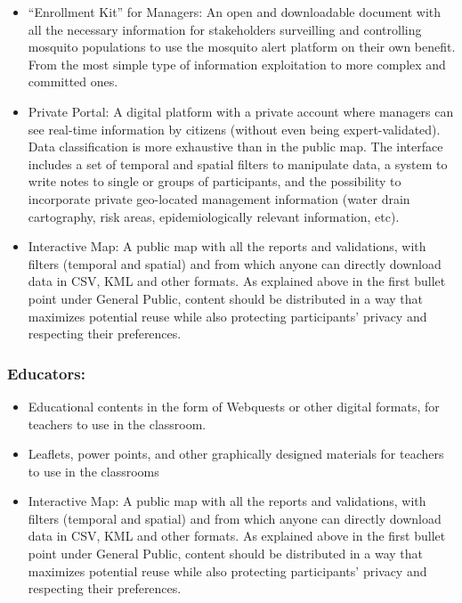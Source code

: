 \documentclass[]{article}
\providecommand{\tightlist}{%
  \setlength{\itemsep}{0pt}\setlength{\parskip}{0pt}}
\begin{document}
\begin{itemize}
\tightlist
\item
  ``Enrollment Kit'' for Managers: An open and downloadable document with all the necessary information for stakeholders surveilling and controlling mosquito populations to use the mosquito alert platform on their own benefit. From the most simple type of information exploitation to more complex and committed ones.
\item
  Private Portal: A digital platform with a private account where managers can see real-time information by citizens (without even being expert-validated). Data classification is more exhaustive than in the public map. The interface includes a set of temporal and spatial filters to manipulate data, a system to write notes to single or groups of participants, and the possibility to incorporate private geo-located management information (water drain cartography, risk areas, epidemiologically relevant information, etc).
\item
  Interactive Map: A public map with all the reports and validations, with filters (temporal and spatial) and from which anyone can directly download data in CSV, KML and other formats. As explained above in the first bullet point under General Public, content should be distributed in a way that maximizes potential reuse while also protecting participants' privacy and respecting their preferences.
\end{itemize}

\hypertarget{educators}{%
\subsubsection{Educators:}\label{educators}}

\begin{itemize}
\tightlist
\item
  Educational contents in the form of Webquests or other digital formats, for teachers to use in the classroom.
\item
  Leaflets, power points, and other graphically designed materials for teachers to use in the classrooms
\item
  Interactive Map: A public map with all the reports and validations, with filters (temporal and spatial) and from which anyone can directly download data in CSV, KML and other formats. As explained above in the first bullet point under General Public, content should be distributed in a way that maximizes potential reuse while also protecting participants' privacy and respecting their preferences.
\end{itemize}
\end{document}

